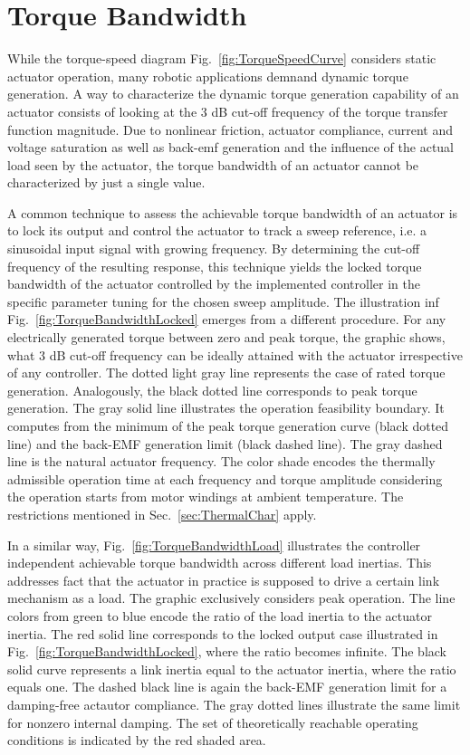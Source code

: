 \documentclass[a4paper,10pt]{cjtdsheet}      %
\begin{document}
\section{Torque Bandwidth}

\begin{multicols}{2}

While the torque-speed diagram Fig.~\ref{fig:TorqueSpeedCurve} considers static actuator operation, many robotic applications demnand dynamic torque generation. A way to characterize the dynamic torque generation capability of an actuator consists of looking at the 3 dB cut-off frequency of the torque transfer function magnitude. Due to nonlinear friction, actuator compliance, current and voltage saturation as well as back-emf generation and the influence of the actual load seen by the actuator, the torque bandwidth of an actuator cannot be characterized by just a single value.

A common technique to assess the achievable torque bandwidth of an actuator is to lock its output and control the actuator to track a sweep reference, i.e. a sinusoidal input signal with growing frequency. By determining the cut-off frequency of the resulting response, this technique yields the locked torque bandwidth of the actuator controlled by the implemented controller in the specific parameter tuning for the chosen sweep amplitude. The illustration inf Fig.~\ref{fig:TorqueBandwidthLocked} emerges from a different procedure. For any electrically generated torque between zero and peak torque, the graphic shows, what 3 dB cut-off frequency can be ideally attained with the actuator irrespective of any controller. The dotted light gray line represents the case of rated torque generation. Analogously, the black dotted line corresponds to peak torque generation. The gray solid line illustrates the operation feasibility boundary. It computes from the minimum of the peak torque generation curve (black dotted line) and the back-EMF generation limit (black dashed line). The gray dashed line is the natural actuator frequency. The color shade encodes the thermally admissible operation time at each frequency and torque amplitude considering the operation starts from motor windings at ambient temperature. The restrictions mentioned in Sec.~\ref{sec:ThermalChar} apply.

In a similar way, Fig.~\ref{fig:TorqueBandwidthLoad} illustrates the controller independent achievable torque bandwidth across different load inertias. This addresses fact that the actuator in practice is supposed to drive a certain link mechanism as a load. The graphic exclusively considers peak operation. The line colors from green to blue encode the ratio of the load inertia to the actuator inertia. The red solid line corresponds to the locked output case illustrated in Fig.~\ref{fig:TorqueBandwidthLocked}, where the ratio becomes infinite. The black solid curve represents a link inertia equal to the actuator inertia, where the ratio equals one. The dashed black line is again the back-EMF generation limit for a damping-free actautor compliance. The gray dotted lines illustrate the same limit for nonzero internal damping. The set of theoretically reachable operating conditions is indicated by the red shaded area.


\end{multicols}
\end{document}
